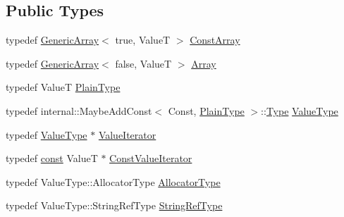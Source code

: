 \subsection*{Public Types}
\begin{DoxyCompactItemize}
\item 
typedef \hyperlink{classGenericArray}{Generic\+Array}$<$ true, ValueT $>$ \hyperlink{classGenericArray_a84f0b14518bc5cc44b4ff76a7d5ef81b}{Const\+Array}
\item 
typedef \hyperlink{classGenericArray}{Generic\+Array}$<$ false, ValueT $>$ \hyperlink{classGenericArray_a6683902e86c051c2319e873537dca7b1}{Array}
\item 
typedef ValueT \hyperlink{classGenericArray_aecea8be3dca6799bc523f4bffd221839}{Plain\+Type}
\item 
typedef internal\+::\+Maybe\+Add\+Const$<$ Const, \hyperlink{classGenericArray_aecea8be3dca6799bc523f4bffd221839}{Plain\+Type} $>$\+::\hyperlink{rapidjson_8h_a1d1cfd8ffb84e947f82999c682b666a7}{Type} \hyperlink{classGenericArray_a93e53f38a99fc5167eb2a28653de64ed}{Value\+Type}
\item 
typedef \hyperlink{classGenericArray_a93e53f38a99fc5167eb2a28653de64ed}{Value\+Type} $\ast$ \hyperlink{classGenericArray_afc6ad62c3f00531fa378db266182704a}{Value\+Iterator}
\item 
typedef \hyperlink{classGenericArray_a25d2ed55daa117c41db6a5b3f87e9ddc}{const} ValueT $\ast$ \hyperlink{classGenericArray_a1cd7bb3e75ccfeed3e8b0a6bb5563d68}{Const\+Value\+Iterator}
\item 
typedef Value\+Type\+::\+Allocator\+Type \hyperlink{classGenericArray_af9cdc12de03c742b9c33dfc172756b97}{Allocator\+Type}
\item 
typedef Value\+Type\+::\+String\+Ref\+Type \hyperlink{classGenericArray_a8dcb9e2a2e103ce1051c16a7486465b9}{String\+Ref\+Type}
\end{DoxyCompactItemize}
